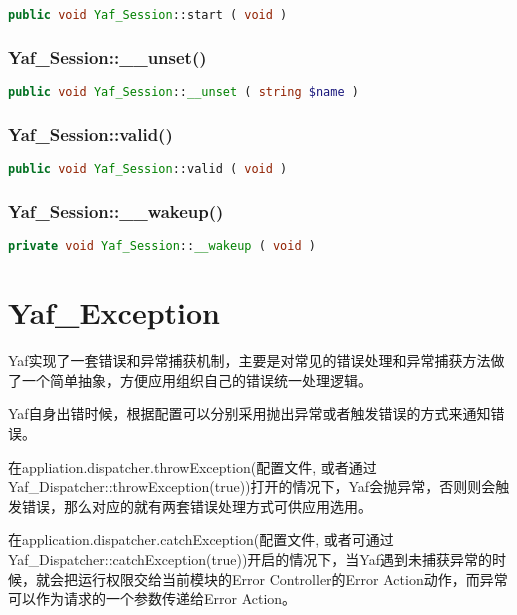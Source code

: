 \begin{lstlisting}[language=PHP]
public void Yaf_Session::start ( void )
\end{lstlisting}

\subsection{Yaf\_Session::\_\_unset()}

\begin{lstlisting}[language=PHP]
public void Yaf_Session::__unset ( string $name )
\end{lstlisting}


\subsection{Yaf\_Session::valid()}

\begin{lstlisting}[language=PHP]
public void Yaf_Session::valid ( void )
\end{lstlisting}

\subsection{Yaf\_Session::\_\_wakeup()}



\begin{lstlisting}[language=PHP]
private void Yaf_Session::__wakeup ( void )
\end{lstlisting}




\chapter{Yaf\_Exception}

Yaf实现了一套错误和异常捕获机制，主要是对常见的错误处理和异常捕获方法做了一个简单抽象，方便应用组织自己的错误统一处理逻辑。

Yaf自身出错时候，根据配置可以分别采用抛出异常或者触发错误的方式来通知错误。

在appliation.dispatcher.throwException(配置文件, 或者通过Yaf\_Dispatcher::throwException(true))打开的情况下，Yaf会抛异常，否则则会触发错误，那么对应的就有两套错误处理方式可供应用选用。

在application.dispatcher.catchException(配置文件, 或者可通过Yaf\_Dispatcher::catchException(true))开启的情况下，当Yaf遇到未捕获异常的时候，就会把运行权限交给当前模块的Error Controller的Error Action动作，而异常可以作为请求的一个参数传递给Error Action。

